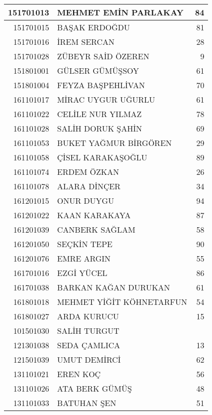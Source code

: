 \documentclass[12pt]{article}
\begin{document}
\begin{multicols}{2}
\begin{longtable}{||r||l||r||}
    \midrule
    151701013 & MEHMET EMİN PARLAKAY & 84 \\
    \midrule
    151701015 & BAŞAK ERDOĞDU & 81 \\
    \midrule
    151701016 & İREM SERCAN & 28 \\
    \midrule
    151701028 & ZÜBEYR SAİD ÖZEREN & 9 \\
    \midrule
    151801001 & GÜLSER GÜMÜŞSOY & 61 \\
    \midrule
    151801004 & FEYZA BAŞPEHLİVAN & 70 \\
    \midrule
    161101017 & MİRAC UYGUR UĞURLU & 61 \\
    \midrule
    161101022 & CELİLE NUR YILMAZ & 78 \\
    \midrule
    161101028 & SALİH DORUK ŞAHİN & 69 \\
    \midrule
    161101053 & BUKET YAĞMUR BİRGÖREN & \cellcolor[rgb]{ 1,  1,  0} 29 \\
    \midrule
    161101058 & ÇİSEL KARAKAŞOĞLU & 89 \\
    \midrule
    161101074 & ERDEM ÖZKAN & 26 \\
    \midrule
    161101078 & ALARA DİNÇER & \cellcolor[rgb]{ 1,  1,  0} 34 \\
    \midrule
    161201015 & ONUR DUYGU & 94 \\
    \midrule
    161201022 & KAAN KARAKAYA & 87 \\
    \midrule
    161201039 & CANBERK SAĞLAM & 58 \\
    \midrule
    161201050 & SEÇKİN TEPE & 90 \\
    \midrule
    161201076 & EMRE ARGIN & \cellcolor[rgb]{ 1,  1,  0} 55 \\
    \midrule
    161701016 & EZGİ YÜCEL & 86 \\
    \midrule
    161701038 & BARKAN KAĞAN DURUKAN & 61 \\
    \midrule
    161801018 & MEHMET YİĞİT KÖHNETARFUN & 54 \\
    \midrule
    161801027 & ARDA KURUCU & 15 \\
    \midrule
    101501030 & SALİH TURGUT &  \\
    \midrule
    121301038 & SEDA ÇAMLICA & 13 \\
    \midrule
    121501039 & UMUT DEMİRCİ & 62 \\
    \midrule
    131101021 & EREN KOÇ & 56 \\
    \midrule
    131101026 & ATA BERK GÜMÜŞ & 48 \\
    \midrule
    131101033 & BATUHAN ŞEN & 51 \\

\end{longtable}
\end{multicols}
\end{document}
